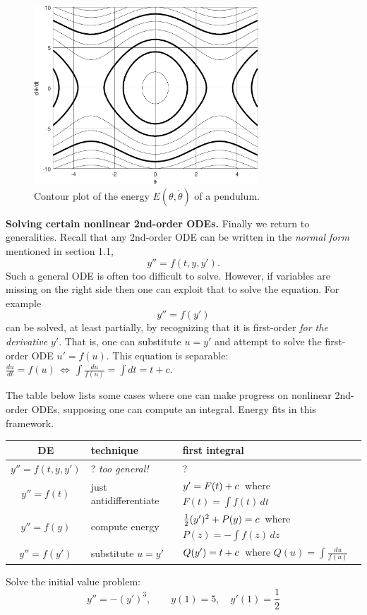 \documentclass[12pt]{article}
\theoremstyle{definition}
\begin{document}
\begin{figure}[h]
\begin{center}
\includegraphics[width=0.75\textwidth]{figs/pendulumcurves}
\end{center}

\vspace{-5mm}
\caption{Contour plot of the energy $E(\theta,\dot\theta)$ of a pendulum.}
\end{figure}

\medskip
\textbf{Solving certain nonlinear 2nd-order ODEs.}  Finally we return to generalities.  Recall that any 2nd-order ODE can be written in the \emph{normal form} mentioned in section 1.1,
    $$y'' = f(t,y,y').$$
Such a general ODE is often too difficult to solve.  However, if variables are missing on the right side then one can exploit that to solve the equation.  For example
    $$y'' = f(y')$$
can be solved, at least partially, by recognizing that it is first-order \emph{for the derivative} $y'$.  That is, one can substitute $u=y'$ and attempt to solve the first-order ODE $u'=f(u)$.  This equation is separable: \, $\frac{du}{dt} = f(u) \, \iff \, \int \frac{du}{f(u)} = \int dt = t + c$.

The table below lists some cases where one can make progress on nonlinear 2nd-order ODEs, supposing one can compute an integral.  Energy fits in this framework.

\medskip
\begin{tabular}{c|l|l}
DE & technique & first integral \\ \hline \hline
$y'' = f(t,y,y')$ & ? \quad \emph{too general!} & ? \\ \hline
$y'' = f(t)$ & just antidifferentiate & $y' = F(t)+c \large\strut$\, where $F(t) = \int f(t)\,dt$ \\ \hline
$y'' = f(y)$ & compute energy & $\frac{1}{2} (y')^2 + P(y) = c \large\strut$\, where $P(z) = -\int f(z)\,dz$ \\ \hline
$y'' = f(y')$ & substitute $u=y'$ & $Q(y') = t + c \large\strut$\, where $Q(u)=\int \frac{du}{f(u)}$
\end{tabular}

\medskip
\begin{exerpart}
Solve the initial value problem:
    $$y'' = - (y')^3, \qquad y(1)=5, \quad y'(1)=\frac{1}{2}$$
\end{exerpart}
\end{document}
